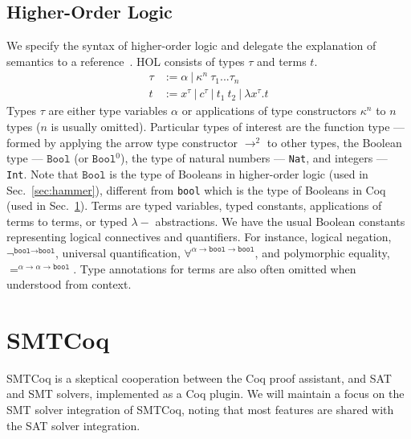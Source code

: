 \documentclass[11pt]{article}
\begin{document}
	\subsection{Higher-Order Logic}
	\label{sec:hol}
	We specify the 
	syntax of higher-order logic 
	and delegate the explanation of 
	semantics to a 
	reference~\cite{10.5555/155278}. 
	HOL consists of 
	types $\tau$ and terms $t$. 
	\begin{align*}
	\tau &:= \alpha\ |\ \kappa^n\ 
	\tau_1 ... \tau_n\\
	t &:= x^{\tau}\ |\ c^{\tau}\ |\ t_1\ t_2\ 
	|\ \lambda x^{\tau}.t
	\end{align*}	
	Types $\tau$ are either type
	variables $\alpha$ or 
	applications of type 
	constructors $\kappa^n$ to 
	$n$ types ($n$ is usually omitted). 
	Particular types of interest are 
	the function type --- formed by 
	applying the arrow type constructor 
	$\to^{2}$ to other types, the 
	Boolean type --- $\texttt{Bool}$ 
	(or $\texttt{Bool}^0$), the type of 
	natural numbers --- \texttt{Nat},
	and integers --- \texttt{Int}.
	Note that $\texttt{Bool}$ is the 
	type of Booleans in higher-order
	logic (used in 
	Sec.~\ref{sec:hammer}), different
	from \texttt{bool} which is the 
	type of Booleans in Coq (used 
	in Sec.~\ref{sec:smtcoq}).
	Terms are typed variables, 
	typed constants, applications 
	of terms to terms, or typed
	$\lambda-$ abstractions. We have
	the usual Boolean constants 
	representing logical connectives
	and quantifiers. For instance, 
	logical negation, 
	$\neg^{\texttt{bool} \to 
		\texttt{bool}}$, universal 
	quantification,
	$\forall^{\alpha \to 
		\texttt{bool} \to \texttt{bool}}$, 
	and polymorphic equality,
	$=^{\alpha \to \alpha 
		\to \texttt{bool}}$. Type 
	annotations for terms are also 
	often omitted when understood
	from context.
	
	
	\section{SMTCoq}
	\label{sec:smtcoq}
	SMTCoq is a skeptical cooperation 
	between the Coq proof assistant, and 
	SAT and SMT solvers, implemented as a 
	Coq plugin. We will maintain a focus 
	on the SMT solver integration of 
	SMTCoq, noting that most features are 
	shared with the SAT	solver integration.
	
\end{document}
